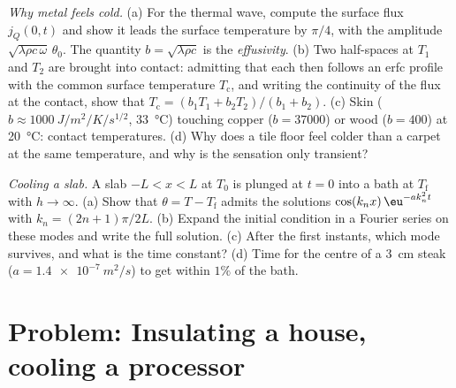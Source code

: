\begin{exercise}[$\star\star\star$]\label{exo:b2:heat-conduction:11}
\emph{Why metal feels cold.} (a) For the thermal wave, compute the
surface flux $j_Q(0,t)$ and show it leads the surface temperature by
$\pi/4$, with the amplitude $\sqrt{\lambda\rho c\,\omega}\,\theta_0$. The
quantity $b = \sqrt{\lambda\rho c}$ is the \emph{effusivity}. (b) Two
half-spaces at $T_1$ and $T_2$ are brought into contact: admitting that
each then follows an erfc profile with the common surface temperature
$T_{\text{c}}$, and writing the continuity of the flux at the contact,
show that $T_{\text{c}} = (b_1T_1 + b_2T_2)/(b_1 + b_2)$. (c) Skin
($b \approx \qty{1000}{J/m^2/K/s^{1/2}}$, \qty{33}{\celsius}) touching
copper ($b = 37000$) or wood ($b = 400$) at \qty{20}{\celsius}: contact
temperatures. (d) Why does a tile floor feel colder than a carpet at
the same temperature, and why is the sensation only transient?
\end{exercise}

\begin{exercise}[$\star\star\star$]\label{exo:b2:heat-conduction:12}
\emph{Cooling a slab.} A slab $-L < x < L$ at $T_0$ is plunged at $t =
0$ into a bath at $T_{\text{f}}$ with $h \to \infty$. (a) Show that $\theta =
T - T_{\text{f}}$ admits the solutions $\cos(k_nx)\,\eu^{-ak_n^2t}$ with $k_n
= (2n+1)\pi/2L$. (b) Expand the initial condition in a Fourier series
on these modes and write the full solution. (c) After the first
instants, which mode survives, and what is the time constant? (d) Time
for the centre of a \qty{3}{cm} steak ($a = \qty{1.4e-7}{m^2/s}$) to get
within $1\%$ of the bath.
\end{exercise}

\section{Problem: Insulating a house, cooling a processor}

